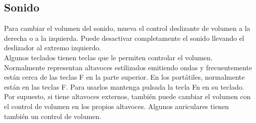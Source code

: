 \subsection{Sonido}
Para cambiar el volumen del sonido, mueva el control deslizante de volumen a la derecha o a la izquierda. Puede desactivar completamente el sonido llevando el deslizador al extremo izquierdo.\\

Algunos teclados tienen teclas que le permiten controlar el volumen. Normalmente representan altavoces estilizados emitiendo ondas y frecuentemente están cerca de las teclas F en la parte superior. En los portátiles, normalmente están en las teclas F. Para usarlos mantenga pulsada la tecla Fn en su teclado.\\

Por supuesto, si tiene altavoces externos, también puede cambiar el volumen con el control de volumen en los propios altavoces. Algunos auriculares tienen también un control de volumen.

